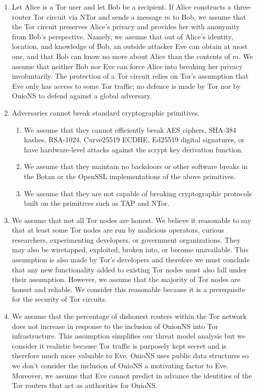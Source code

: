 \documentclass{sig-alternate}
\begin{document}
\begin{enumerate}
	\item Let Alice is a Tor user and let Bob be a recipient. If Alice constructs a three-router Tor circuit via NTor and sends a message $ m $ to Bob, we assume that the Tor circuit preserves Alice's privacy and provides her with anonymity from Bob's perspective. Namely, we assume that out of Alice's identity, location, and knowledge of Bob, an outside attacker Eve can obtain at most one, and that Bob can know no more about Alice than the contents of $ m $. We assume that neither Bob nor Eve can force Alice into breaking her privacy involuntarily. The protection of a Tor circuit relies on Tor's assumption that Eve only has access to some Tor traffic; no defence is made by Tor nor by OnioNS to defend against a global adversary.
	\item Adversaries cannot break standard cryptographic primitives.
		\begin{enumerate}
			\item We assume that they cannot efficiently break AES ciphers, SHA-384 hashes, RSA-1024, Curve25519 ECDHE, Ed25519 digital signatures, or have hardware-level attacks against the scrypt key derivation function.
			\item We assume that they maintain no backdoors or other software breaks in the Botan or the OpenSSL implementations of the above primitives.
			\item We assume that they are not capable of breaking cryptographic protocols built on the primitives such as TAP and NTor.
		\end{enumerate}
	\item We assume that not all Tor nodes are honest. We believe it reasonable to say that at least some Tor nodes are run by malicious operators, curious researchers, experimenting developers, or government organizations. They may also be wiretapped, exploited, broken into, or become unavailable. This assumption is also made by Tor's developers and therefore we must conclude that any new functionality added to existing Tor nodes must also fall under their assumption. However, we assume that the majority of Tor nodes are honest and reliable. We consider this reasonable because it is a prerequisite for the security of Tor circuits.
	\item We assume that the percentage of dishonest routers within the Tor network does not increase in response to the inclusion of OnionNS into Tor infrastructure. This assumption simplifies our threat model analysis but we consider it realistic because Tor traffic is purposely kept secret and is therefore much more valuable to Eve. OnioNS uses public data structures so we don't consider the inclusion of OnioNS a motivating factor to Eve. Moreover, we assume that Eve cannot predict in advance the identities of the Tor routers that act as authorities for OnioNS.

\end{enumerate}
\end{document}
